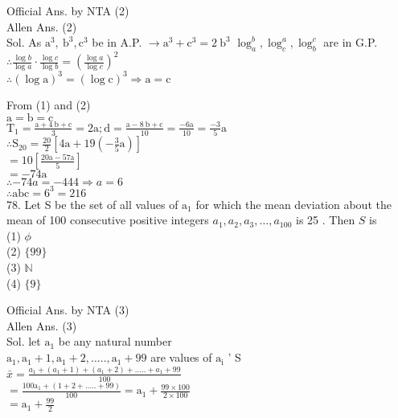 \documentclass[10pt]{article}
\begin{document}
Official Ans. by NTA (2)\\
Allen Ans. (2)\\
Sol. As \(\mathrm{a}^{3}, \mathrm{~b}^{3}, \mathrm{c}^{3}\) be in A.P. \(\rightarrow \mathrm{a}^{3}+\mathrm{c}^{3}=2 \mathrm{~b}^{3}\) \(\log _{a}^{b}, \log _{c}^{a}, \log _{b}^{c}\) are in G.P.\\
\(\therefore \frac{\log b}{\log a} \cdot \frac{\log c}{\log b}=\left(\frac{\log a}{\log c}\right)^{2}\)\\
\(\therefore(\log \mathrm{a})^{3}=(\log \mathrm{c})^{3} \Rightarrow \mathrm{a}=\mathrm{c}\)

From (1) and (2)\\
\(\mathrm{a}=\mathrm{b}=\mathrm{c}\)\\
\(\mathrm{T}_{1}=\frac{\mathrm{a}+4 \mathrm{~b}+\mathrm{c}}{3}=2 \mathrm{a} ; \mathrm{d}=\frac{\mathrm{a}-8 \mathrm{~b}+\mathrm{c}}{10}=\frac{-6 \mathrm{a}}{10}=\frac{-3}{5} \mathrm{a}\)\\
\(\therefore \mathrm{S}_{20}=\frac{20}{2}\left[4 \mathrm{a}+19\left(-\frac{3}{5} \mathrm{a}\right)\right]\)\\
\(=10\left[\frac{20 \mathrm{a}-57 \mathrm{a}}{5}\right]\)\\
\(=-74 \mathrm{a}\)\\
\(\therefore-74 a=-444 \Rightarrow a=6\)\\
\(\therefore \mathrm{abc}=6^{3}=216\)\\
78. Let S be the set of all values of \(\mathrm{a}_{1}\) for which the mean deviation about the mean of 100 consecutive positive integers \(a_{1}, a_{2}, a_{3}, \ldots, a_{100}\) is 25 . Then \(S\) is\\
(1) \(\phi\)\\
(2) \(\{99\}\)\\
(3) \(\mathbb{N}\)\\
(4) \(\{9\}\)

Official Ans. by NTA (3)\\
Allen Ans. (3)\\
Sol. let \(\mathrm{a}_{1}\) be any natural number\\
\(\mathrm{a}_{1}, \mathrm{a}_{1}+1, \mathrm{a}_{1}+2, \ldots . ., \mathrm{a}_{1}+99\) are values of \(\mathrm{a}_{\mathrm{i}}\) ' S\\
\(\bar{x}=\frac{a_{1}+\left(a_{1}+1\right)+\left(a_{1}+2\right)+\ldots . .+a_{1}+99}{100}\)\\
\(=\frac{100 \mathrm{a}_{1}+(1+2+\ldots . .+99)}{100}=\mathrm{a}_{1}+\frac{99 \times 100}{2 \times 100}\)\\
\(=\mathrm{a}_{1}+\frac{99}{2}\)
\end{document}
